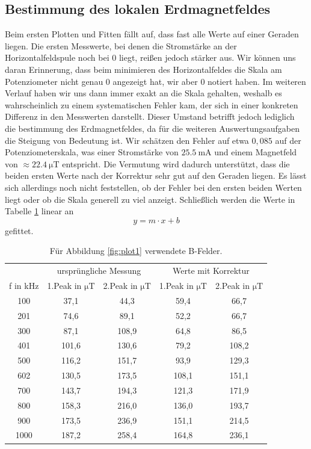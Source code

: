 \documentclass[
  bibliography=totoc,     %
  captions=tableheading,  %
  titlepage=firstiscover, %
]{scrartcl}
\begin{document}
\subsection{Bestimmung des lokalen Erdmagnetfeldes}
Beim ersten Plotten und Fitten fällt auf, dass fast alle Werte auf einer Geraden liegen.
Die ersten Messwerte, bei denen die Stromstärke an der Horizontalfeldspule noch bei 0 liegt,
reißen jedoch stärker aus. Wir können uns daran Erinnerung, dass beim minimieren des Horizontalfeldes
die Skala am Potenziometer nicht genau 0 angezeigt hat, wir aber 0 notiert haben.
Im weiteren Verlauf haben wir uns dann immer exakt an die Skala gehalten, weshalb es
wahrscheinlich zu einem systematischen Fehler kam, der sich in einer konkreten Differenz
in den Messwerten darstellt. Dieser Umstand betrifft jedoch lediglich die bestimmung des
Erdmagnetfeldes, da für die weiteren Auswertungsaufgaben die Steigung von
Bedeutung ist. Wir schätzen den Fehler auf etwa $0,085$ auf der Potenziometerskala,
was einer Stromstärke von $\SI{25.5}{\milli\ampere}$ und einem Magnetfeld von $\approx\SI{22.4}{\micro\tesla}$ entspricht. Die Vermutung wird dadurch
unterstützt, dass die beiden ersten Werte nach der Korrektur sehr gut auf den
Geraden liegen. Es lässt sich allerdings noch nicht feststellen, ob der Fehler bei den
ersten beiden Werten liegt oder ob die Skala generell zu viel anzeigt.
Schließlich werden die Werte in Tabelle \ref{tab:4} linear an
\begin{equation}
  y = m \cdot x + b
\end{equation}
gefittet.
\begin{table}[H]
  \centering
  \caption{Für Abbildung \ref{fig:plot1} verwendete B-Felder.}
  \label{tab:4}
  \begin{tabular}{c c c c c}
    \toprule
    & \multicolumn{2}{c}{ursprüngliche Messung} & \multicolumn{2}{c}{Werte mit Korrektur}\\
    f in \si{\kilo\hertz} & 1.Peak in $\si{\micro\tesla}$ & 2.Peak in $\si{\micro\tesla}$ & 1.Peak in $\si{\micro\tesla}$ & 2.Peak in $\si{\micro\tesla}$ \\
    \midrule
    100  &  37,1 &  44,3 &  59,4 &  66,7 \\
    201  &  74,6 &  89,1 &  52,2 &  66,7 \\
    300  &  87,1 & 108,9 &  64,8 &  86,5 \\
    401  & 101,6 & 130,6 &  79,2 & 108,2 \\
    500  & 116,2 & 151,7 &  93,9 & 129,3 \\
    602  & 130,5 & 173,5 & 108,1 & 151,1 \\
    700  & 143,7 & 194,3 & 121,3 & 171,9 \\
    800  & 158,3 & 216,0 & 136,0 & 193,7 \\
    900  & 173,5 & 236,9 & 151,1 & 214,5 \\
    1000 & 187,2 & 258,4 & 164,8 & 236,1 \\
    \bottomrule
  \end{tabular}
\end{table}
\end{document}
